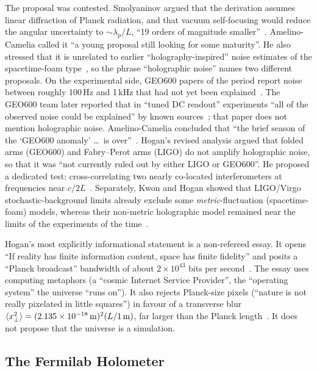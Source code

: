 The proposal was contested. Smolyaninov argued that the derivation assumes
linear diffraction of Planck radiation, and that vacuum self-focusing would
reduce the angular uncertainty to $\sim\lambda_p/L$, ``19 orders of magnitude
smaller''~\cite{Smolyaninov2009level}. Amelino-Camelia called it ``a young
proposal still looking for some maturity''. He also stressed that it is unrelated
to earlier ``holography-inspired'' noise estimates of the spacetime-foam
type~\cite{AmelinoCamelia2013quantum}, so the phrase ``holographic noise'' names
two different proposals. On the experimental side, GEO600 papers of the period
report noise between roughly 100\,Hz and 1\,kHz that had not yet been
explained~\cite{Hild2009dcreadout,Luck2010upgrade}. The GEO600 team later
reported that in ``tuned DC readout'' experiments ``all of the observed noise
could be explained'' by known sources~\cite{Luck2010upgrade}; that paper does not
mention holographic noise. Amelino-Camelia concluded that ``the brief season of
the `GEO600 anomaly' \ldots\ is over''~\cite{AmelinoCamelia2013quantum}.
Hogan's revised analysis argued that folded arms (GEO600) and Fabry--Perot arms
(LIGO) do not amplify holographic noise, so that it was ``not currently ruled out
by either LIGO or GEO600''. He proposed a dedicated test: cross-correlating two
nearly co-located interferometers at frequencies near $c/2L$~\cite{Hogan2012interferometers}.
Separately, Kwon and Hogan showed that LIGO/Virgo stochastic-background limits
already exclude some \emph{metric}-fluctuation (spacetime-foam) models, whereas
their non-metric holographic model remained near the limits of the experiments
of the time~\cite{Kwon2016interferometric}.

Hogan's most explicitly informational statement is a non-refereed essay. It
opens ``If reality has finite information content, space has finite fidelity''
and posits a ``Planck broadcast'' bandwidth of about $2\times10^{43}$ bits per
second~\cite{Hogan2013now}. The essay uses computing metaphors (a ``cosmic
Internet Service Provider'', the ``operating system'' the universe ``runs on'').
It also rejects Planck-size pixels (``nature is not really pixelated in little
squares'') in favour of a transverse blur
$\langle x_\perp^2\rangle=(2.135\times10^{-18}\,{\rm m})^2(L/1\,{\rm m})$, far
larger than the Planck length~\cite{Hogan2013now}. It does not propose that the
universe is a simulation.

\subsection{The Fermilab Holometer}

